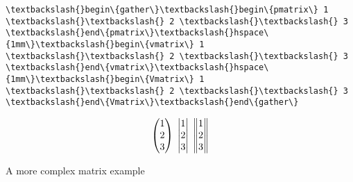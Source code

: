 \documentclass[11pt]{article}
\begin{document}
    \begin{Verbatim}[commandchars=\\\{\}]
\textbackslash{}begin\{gather\}\textbackslash{}begin\{pmatrix\} 1 \textbackslash{}\textbackslash{} 2 \textbackslash{}\textbackslash{} 3
\textbackslash{}end\{pmatrix\}\textbackslash{}hspace\{1mm\}\textbackslash{}begin\{vmatrix\} 1 \textbackslash{}\textbackslash{} 2 \textbackslash{}\textbackslash{} 3
\textbackslash{}end\{vmatrix\}\textbackslash{}hspace\{1mm\}\textbackslash{}begin\{Vmatrix\} 1 \textbackslash{}\textbackslash{} 2 \textbackslash{}\textbackslash{} 3 \textbackslash{}end\{Vmatrix\}\textbackslash{}end\{gather\}
    \end{Verbatim}

    \[ \begin{gather}\begin{pmatrix} 1 \\ 2 \\ 3 \end{pmatrix}\hspace{1mm}\begin{vmatrix} 1 \\ 2 \\ 3 \end{vmatrix}\hspace{1mm}\begin{Vmatrix} 1 \\ 2 \\ 3 \end{Vmatrix}\end{gather} \]

    A more complex matrix example
\end{document}
